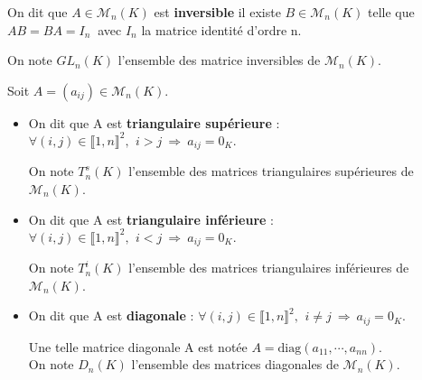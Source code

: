 \vspace{1cm}

\noindent On dit que \(A\in \mathcal{M}_n(K)\) est \textbf{inversible} \ssi il existe \(B\in \mathcal{M}_n(K)\) telle que\\ 
\(AB=BA=I_n\ \) avec \(I_n\) la matrice identité d'ordre n.\vspace{0.1cm}\\
\begin{small}
    On note \(GL_n(K)\) l'ensemble des matrice inversibles de \(\mathcal{M}_n(K)\).
\end{small}

\vspace{1.2cm}

Soit \(A=(a_{ij})\in \mathcal{M}_n(K)\).\vspace{-0.1cm}
\begin{itemize}[leftmargin=0cm,rightmargin=0cm, label=•]
    \item On dit que A est \textbf{triangulaire supérieure} \ssi : \(\forall (i,j)\in \llbracket 1,n \rrbracket^2,\ \,i>j\ \Rightarrow \ a_{ij}=0_K.\)\vspace{0.1cm}\\
    \begin{small}
          On note \(T_n^s(K)\) l'ensemble des matrices triangulaires supérieures de \(\mathcal{M}_n(K)\).
    \end{small}\vspace{0.2cm}
    
    \item On dit que A est \textbf{triangulaire inférieure} \ssi : \(\forall (i,j)\in \llbracket 1,n \rrbracket^2,\ \,i<j\ \Rightarrow \ a_{ij}=0_K.\)\vspace{0.1cm}\\
    \begin{small}
        On note \(T_n^i(K)\) l'ensemble des matrices triangulaires inférieures de \(\mathcal{M}_n(K)\).
    \end{small}\vspace{0.2cm}
    
    \item On dit que A est \textbf{diagonale} \ssi :  \(\forall (i,j)\in \llbracket 1,n \rrbracket^2,\ \,i\neq j\ \Rightarrow \ a_{ij}=0_K.\)\vspace{0.1cm}\\
    \begin{small}
        Une telle matrice diagonale A est notée \(A=\text{diag}(a_{11},\cdots,a_{nn})\).\\
        On note \(D_n(K)\) l'ensemble des matrices diagonales de \(\mathcal{M}_n(K)\).  
    \end{small}\vspace{0.2cm}
    


\end{itemize}
